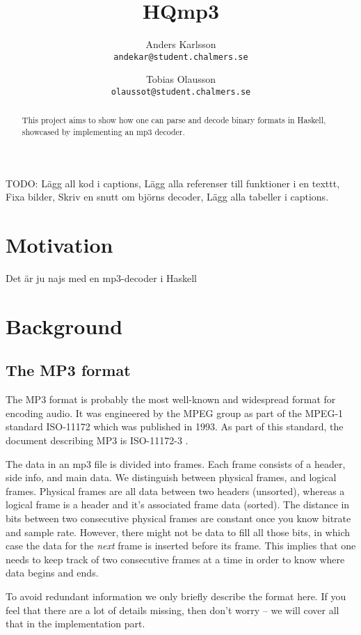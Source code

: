 \documentclass[a4paper,12pt]{article}
\title{HQmp3}
\author{Anders Karlsson \\ \small{\texttt{andekar@student.chalmers.se}}
   \and Tobias Olausson \\ \small{\texttt{olaussot@student.chalmers.se}}
}
\begin{document}
\maketitle

\begin{abstract}
    This project aims to show how one can parse and decode binary formats in
    Haskell, showcased by implementing an mp3 decoder.
\end{abstract}

\tableofcontents


TODO: Lägg all kod i captions,
      Lägg alla referenser till funktioner i en texttt,
      Fixa bilder,
      Skriv en snutt om björns decoder,
      Lägg alla tabeller i captions.

\section{Motivation}
    Det är ju najs med en mp3-decoder i Haskell

\section{Background}
    \subsection{The MP3 format}
       The MP3 format is probably the most well-known and widespread format for
       encoding audio. It was engineered by the MPEG group as part of the MPEG-1
       standard ISO-11172 which was published in 1993. As part of this standard,
       the document describing MP3 is ISO-11172-3 \cite{wikimp3,wikimpeg1}.

       The data in an mp3 file is divided into frames. Each frame consists of
       a header, side info, and main data. We distinguish between physical
       frames, and logical frames. Physical frames are all data between two
       headers (unsorted), whereas a logical frame is a header and it's
       associated frame data (sorted). The distance in bits between two
       consecutive physical frames are constant once you know bitrate and sample
       rate. However, there might not be data to fill all those bits, in which
       case the data for the \textit{next} frame is inserted before its frame.
       This implies that one needs to keep track of two consecutive frames at a 
       time in order to know where data begins and ends.

       To avoid redundant information we only briefly describe the format here.
       If you feel that there are a lot of details missing, then don't worry --
       we will cover all that in the implementation part.
\end{document}
